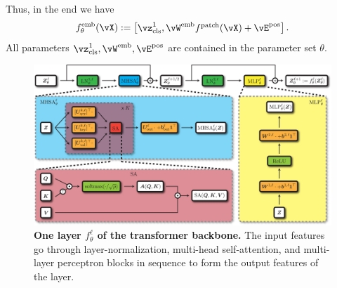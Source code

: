 \documentclass[../../book-main.tex]{subfiles}
\begin{document}
Thus, in the end we have 
\begin{equation}\label{eq:definition_of_embedding_module}
    f_{\theta}^{\emb}(\vX) := \mat{\vz_{\cls}^{1}, \vW^{\emb}f^{\patch}(\vX) + \vE^{\pos}}.
\end{equation}
All parameters \(\vz_{\cls}^{1}, \vW^{\emb}, \vE^{\pos}\) are contained in the parameter set \(\theta\).

\begin{figure}
    \centering 
    \includegraphics[width=\textwidth]{chapters/chapter7/figs/transformer_backbone.pdf}
    \caption{\small\textbf{One layer \(f_{\theta}^{\ell}\) of the transformer backbone.} The input features go through layer-normalization, multi-head self-attention, and multi-layer perceptron blocks in sequence to form the output features of the layer.}
    \label{fig:transformer_backbone}
\end{figure}
\end{document}
